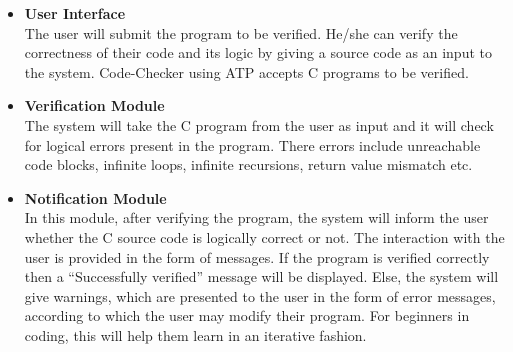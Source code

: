 \documentclass[]{article}
\begin{document}
\begin{itemize}
 \item \textbf{User Interface} \\

The user will submit the program to be verified. He/she can verify the
correctness of their code and its logic by giving a source code as an
input to the system. Code-Checker using ATP accepts C programs to be
verified. \\

\item \textbf{Verification Module} \\

The system will take the C program from the user as input and it will
check for logical errors present in the program. There errors include
unreachable code blocks, infinite loops, infinite recursions, return
value mismatch etc. \\

\item \textbf{Notification Module} \\

In this module, after verifying the program, the system will inform the
user whether the C source code is logically correct or not. The
interaction with the user is provided in the form of messages. If the
program is verified correctly then a ``Successfully verified'' message
will be displayed. Else, the system will give warnings, which are
presented to the user in the form of error messages, according to which
the user may modify their program. For beginners in coding, this will
help them learn in an iterative fashion.

\end{itemize}
\end{document}
